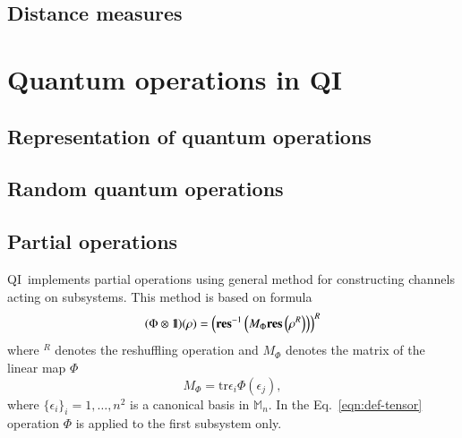 \documentclass[final,3p,times]{elsarticle}
\newcommand{\res}{\mathbf{res}}
\newcommand{\1}{{\rm 1\hspace{-0.9mm}l}}
\newcommand{\Id}{\1}
\newcommand{\tr}{\mathrm{tr}}
\newcommand{\M}{\ensuremath{\mathbb{M}}}
\newcommand{\qi}{QI}
\begin{document}
\subsection{Distance measures}


\section{Quantum operations in \qi}\label{sec:channels}

\subsection{Representation of quantum operations}

\subsection{Random quantum operations}
\cite{Bruzda2009320}

\subsection{Partial operations}
\qi\ implements partial operations using general method for constructing
channels acting on subsystems. This method is based on formula
\begin{equation}\label{eqn:def-tensor}
(\Phi\otimes\Id)(\rho) = 
\left(\res^{-1}\left(M_\Phi\res\left(\rho^R\right)\right)\right)^R
\end{equation}
where ${}^R$ denotes the reshuffling operation and $M_\Phi$ denotes the matrix
of the linear map $\Phi$
\begin{equation}
M_\Phi = \tr \epsilon_i \Phi(\epsilon_j),
\end{equation}
where $\{\epsilon_i\}_i=1,\ldots,n^2$ is a canonical basis in $\M_n$. In the 
Eq.~\ref{eqn:def-tensor} operation $\Phi$ is applied to the first subsystem 
only.
\end{document}
